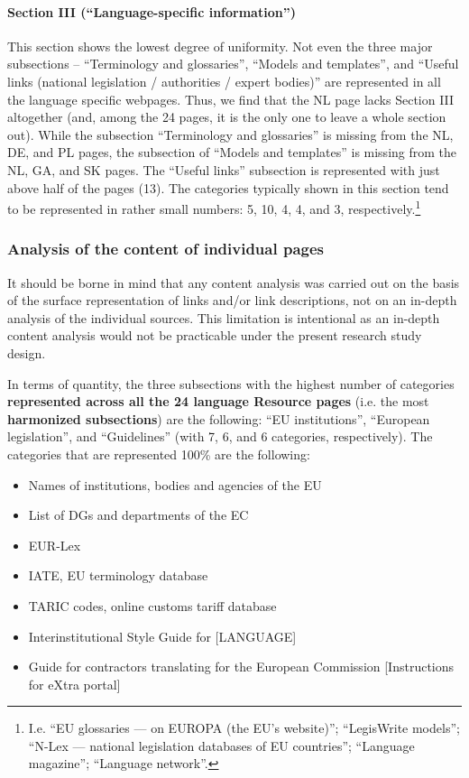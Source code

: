 \documentclass[output=paper]{langsci/langscibook}
\begin{document}
\paragraph*{Section III (“Language-specific information”)}

This section shows the lowest degree of uniformity. Not even the three major subsections – “Terminology and glossaries”, “Models and templates”, and “Useful links (national legislation / authorities / expert bodies)” are represented in all the language specific webpages. Thus, we find that the NL page lacks Section III altogether (and, among the 24 pages, it is the only one to leave a whole section out). While the subsection “Terminology and glossaries” is missing from the NL, DE, and PL pages, the subsection of “Models and templates” is missing from the NL, GA, and SK pages. The “Useful links” subsection is represented with just above half of the pages (13). The categories typically shown in this section tend to be represented in rather small numbers: 5, 10, 4, 4, and 3, respectively.\footnote{I.e. “EU glossaries — on EUROPA (the EU's website)”; “LegisWrite models”; “N-Lex — national legislation databases of EU countries”; “Language magazine”; “Language network”.}

\subsubsection{Analysis of the content of individual pages}\label{sec:svoboda:4.3.3}
It should be borne in mind that any content analysis was carried out on the basis of the surface representation of links and/or link descriptions, not on an in-depth analysis of the individual sources. This limitation is intentional as an in-depth content analysis would not be practicable under the present research study design.

In terms of quantity, the three subsections with the highest number of categories \textbf{represented across all the 24 language Resource pages} (i.e. the most \textbf{harmonized subsections}) are the following: “EU institutions”, “European legislation”, and “Guidelines” (with 7, 6, and 6 categories, respectively). The categories that are represented 100\% are the following:

\begin{itemize}
\item 
Names of institutions, bodies and agencies of the EU
\item 
List of DGs and departments of the EC
\item 
EUR-Lex
\item 
IATE, EU terminology database
\item 
TARIC codes, online customs tariff database
\item 
Interinstitutional Style Guide for [LANGUAGE]
\item 
Guide for contractors translating for the European Commission [Instructions for eXtra portal]
\end{itemize}
\end{document}
